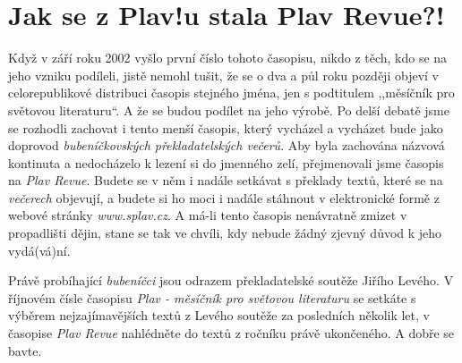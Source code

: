 \section{Jak se z Plav!u stala Plav Revue?!}
Když v září roku 2002 vyšlo první číslo tohoto časopisu, nikdo z těch, kdo se na jeho vzniku podíleli, jistě nemohl tušit, že se o dva a půl roku později objeví v celorepublikové distribuci časopis stejného jména, jen s podtitulem ,,měsíčník pro světovou literaturu``. A že se budou podílet na jeho výrobě. Po delší debatě jsme se rozhodli zachovat i tento menší časopis, který vycházel a vycházet bude jako doprovod \textit{bubeníčkovských překladatelských večerů}. Aby byla zachována názvová kontinuta a nedocházelo k lezení si do jmenného zelí, přejmenovali jsme časopis na \textit{Plav Revue}. Budete se v něm i nadále setkávat s překlady textů, které se na \textit{večerech} objevují, a budete si ho moci i nadále stáhnout v elektronické formě z webové stránky \textit{www.splav.cz}. A má-li tento časopis nenávratně zmizet v propadlišti dějin, stane se tak ve chvíli, kdy nebude žádný zjevný důvod k jeho vydá(vá)ní. 

Právě probíhající \textit{bubeníčci} jsou odrazem překladatelské soutěže Jiřího Levého. V říjnovém čísle časopisu \textit{Plav - měsíčník pro světovou literaturu} se setkáte s výběrem nejzajímavějších textů z Levého soutěže za posledních několik let, v časopise \textit{Plav Revue} nahlédněte do textů z ročníku právě ukončeného. A dobře se bavte.

